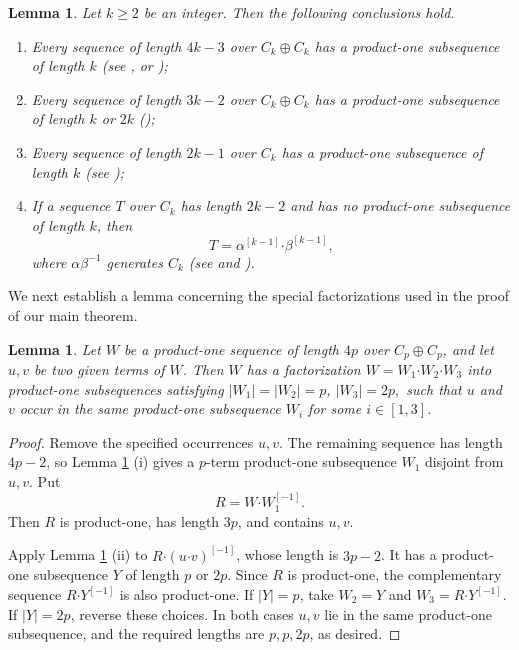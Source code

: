\documentclass[a4paper, 12pt]{article}
\newtheorem{lemma}[theorem]{Lemma}
\theoremstyle{definition}
\begin{document}
\begin{lemma}\label{lemma:someresultsrank2}
Let $k\geq 2$ be an integer. Then the following conclusions hold.

\begin{enumerate}[label=\rm(\roman*)]
\item Every sequence of length $4k-3$ over $C_k\oplus C_k$ has a
product-one subsequence of length $k$ (see \cite{Reiher}, or \cite[Theorem 4.2.10]{GRuzsa});

\item Every sequence of length $3k-2$ over $C_k\oplus C_k$ has a
product-one subsequence of length $k$ or $2k$ (\cite[Theorem 6.7 (2)]{GaoGeroldingersurvey});

\item Every sequence of length $2k-1$ over $C_k$ has a product-one
subsequence of length $k$ (see \cite{EGZ});

\item If a sequence $T$ over $C_k$ has length $2k-2$ and has no product-one subsequence of length $k$, then
$$T=\alpha^{[k-1]}\boldsymbol{\cdot}\beta^{[k-1]},$$
where $\alpha\beta^{-1}$ generates $C_k$ (see \cite[Lemma 4]{BialostockiDierker} and \cite[Theorem 3.1]{FloresOrdaz}).
\end{enumerate}
\end{lemma}



We next establish a lemma concerning the special factorizations used in the proof of our main theorem.


\begin{lemma}\label{lemma:pairfactorization}
Let $W$ be a product-one sequence of length $4p$ over
$C_p\oplus C_p$, and let $u,v$ be two given terms of
$W$.  Then $W$ has a factorization
$W=W_1\boldsymbol{\cdot}W_2\boldsymbol{\cdot}W_3$
into product-one subsequences satisfying
$|W_1|=|W_2|=p$, $|W_3|=2p,$
such that $u$ and $v$ occur in the same product-one subsequence $W_i$ for some $i\in [1,3]$.
\end{lemma}

\begin{proof} Remove the specified occurrences $u,v$.  The remaining sequence has
length $4p-2$, so Lemma \ref{lemma:someresultsrank2} (i) gives a $p$-term
product-one subsequence $W_1$ disjoint from $u,v$.  Put
$$R=W\boldsymbol{\cdot}W_1^{[-1]}.$$
Then $R$ is product-one, has length $3p$, and contains $u,v$.

Apply Lemma \ref{lemma:someresultsrank2} (ii) to
$R\boldsymbol{\cdot}(u\boldsymbol{\cdot}v)^{[-1]}$, whose length is
$3p-2$.  It has a product-one subsequence $Y$ of length $p$ or $2p$.
Since $R$ is product-one, the complementary sequence
$R\boldsymbol{\cdot}Y^{[-1]}$ is also product-one.  If $|Y|=p$, take
$W_2=Y$ and $W_3=R\boldsymbol{\cdot}Y^{[-1]}$.  If $|Y|=2p$, reverse
these choices.  In both cases $u,v$ lie in the same product-one subsequence,
and the required lengths are $p,p,2p$, as desired.
\end{proof}
\end{document}
